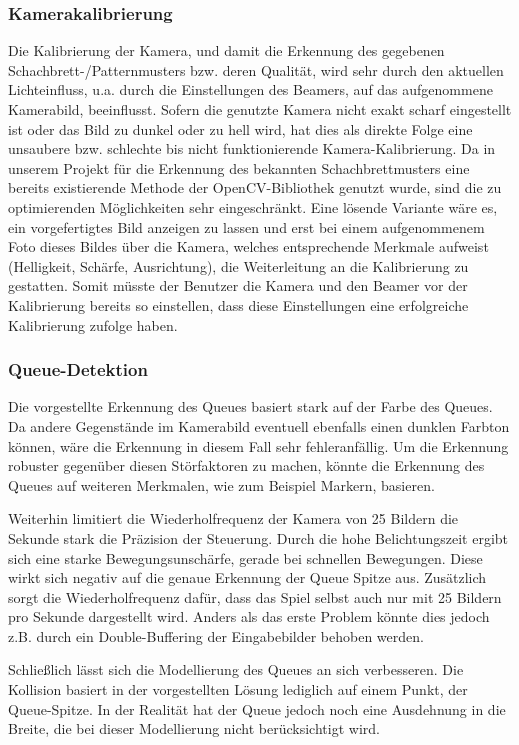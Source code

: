  \subsubsection{Kamerakalibrierung}
Die Kalibrierung der Kamera, und damit die Erkennung des gegebenen Schachbrett-/Patternmusters bzw. deren Qualität, wird sehr durch den aktuellen Lichteinfluss, u.a. durch die Einstellungen des Beamers, auf das aufgenommene Kamerabild, beeinflusst.
Sofern die genutzte Kamera nicht exakt scharf eingestellt ist oder das Bild zu dunkel oder zu hell wird, hat dies als direkte Folge eine unsaubere bzw. schlechte bis nicht funktionierende Kamera-Kalibrierung. 
Da in unserem Projekt für die Erkennung des bekannten Schachbrettmusters eine bereits existierende Methode der OpenCV-Bibliothek genutzt wurde, sind die zu optimierenden Möglichkeiten sehr eingeschränkt.
Eine lösende Variante wäre es, ein vorgefertigtes Bild anzeigen zu lassen und erst bei einem aufgenommenem Foto dieses Bildes über die Kamera, welches entsprechende Merkmale aufweist (Helligkeit, Schärfe, Ausrichtung), die Weiterleitung an die Kalibrierung zu gestatten. Somit müsste der Benutzer die Kamera und den Beamer vor der Kalibrierung bereits so einstellen, dass diese Einstellungen eine erfolgreiche Kalibrierung zufolge haben.

\subsubsection{Queue-Detektion}
Die vorgestellte Erkennung des Queues basiert stark auf der Farbe des Queues. 
Da andere Gegenstände im Kamerabild eventuell ebenfalls einen dunklen Farbton können, wäre die Erkennung in diesem Fall sehr fehleranfällig. 
Um die Erkennung robuster gegenüber diesen Störfaktoren zu machen, könnte die Erkennung des Queues auf weiteren Merkmalen, wie zum Beispiel Markern, basieren.

Weiterhin limitiert die Wiederholfrequenz der Kamera von 25 Bildern die Sekunde stark die Präzision der Steuerung. 
Durch die hohe Belichtungszeit ergibt sich eine starke Bewegungsunschärfe, gerade bei schnellen Bewegungen. 
Diese wirkt sich negativ auf die genaue Erkennung der Queue Spitze aus.
Zusätzlich sorgt die Wiederholfrequenz dafür, dass das Spiel selbst auch nur mit 25 Bildern pro Sekunde dargestellt wird. 
Anders als das erste Problem könnte dies jedoch z.B. durch ein Double-Buffering der Eingabebilder behoben werden.

Schließlich lässt sich die Modellierung des Queues an sich verbesseren.
Die Kollision basiert in der vorgestellten Lösung lediglich auf einem Punkt, der Queue-Spitze.
In der Realität hat der Queue jedoch noch eine Ausdehnung in die Breite, die bei dieser Modellierung nicht berücksichtigt wird.

